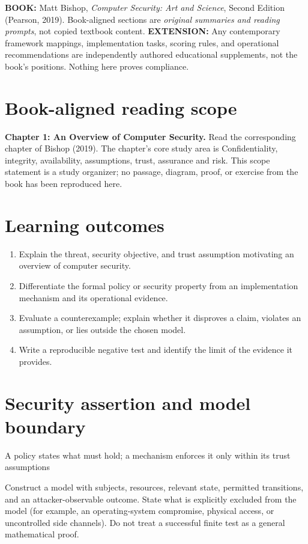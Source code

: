 \documentclass[10pt,letterpaper]{article}
\begin{document}
\makedoctocpage
\begin{notebox}
\textbf{BOOK:} Matt Bishop, \emph{Computer Security: Art and Science}, Second Edition (Pearson, 2019). Book-aligned sections are \emph{original summaries and reading prompts}, not copied textbook content.
\textbf{EXTENSION:} Any contemporary framework mappings, implementation tasks, scoring rules, and operational recommendations are independently authored educational supplements, not the book's positions. Nothing here proves compliance.
\end{notebox}
\section{Book-aligned reading scope}
\textbf{Chapter 1: An Overview of Computer Security.} Read the corresponding chapter of Bishop (2019). The chapter's core study area is Confidentiality, integrity, availability, assumptions, trust, assurance and risk. This scope statement is a study organizer; no passage, diagram, proof, or exercise from the book has been reproduced here.
\section{Learning outcomes}
\begin{enumerate}
\item Explain the threat, security objective, and trust assumption motivating an overview of computer security.
\item Differentiate the formal policy or security property from an implementation mechanism and its operational evidence.
\item Evaluate a counterexample; explain whether it disproves a claim, violates an assumption, or lies outside the chosen model.
\item Write a reproducible negative test and identify the limit of the evidence it provides.
\end{enumerate}
\section{Security assertion and model boundary}
\begin{infobox}
A policy states what must hold; a mechanism enforces it only within its trust assumptions
\end{infobox}
Construct a model with subjects, resources, relevant state, permitted transitions, and an attacker-observable outcome. State what is explicitly excluded from the model (for example, an operating-system compromise, physical access, or uncontrolled side channels). Do not treat a successful finite test as a general mathematical proof.
\end{document}
